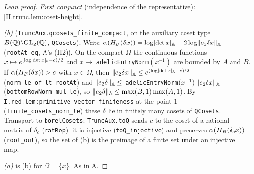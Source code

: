 \begin{proof}[Lean proof]
\emph{First conjunct} (independence of the representative): \cref{II.trunc.lem:coset-height}.

\emph{(b)} (\texttt{TruncAux.qcosets\_finite\_compact}, on the auxiliary coset type $B(\mathbb{Q})\backslash\mathrm{GL}_2(\mathbb{Q})$, \texttt{QCosets}). Write $\alpha(H_B(\delta x))=\log\lvert\det x\rvert_{\mathbb{A}}-2\log\lVert e_2\delta x\rVert_{\mathbb{A}}$ (\texttt{rootAt\_eq}, A's (H2)). On the compact $\Omega$ the continuous functions $x\mapsto e^{(\log\lvert\det x\rvert_{\mathbb{A}}-c)/2}$ and $x\mapsto$ \texttt{adelicEntryNorm}$(x^{-1})$ are bounded by $A$ and $B$. If $\alpha(H_B(\delta x))>c$ with $x\in\Omega$, then $\lVert e_2\delta x\rVert_{\mathbb{A}}\le e^{(\log\lvert\det x\rvert_{\mathbb{A}}-c)/2}$ (\texttt{norm\_le\_of\_lt\_rootAt}) and $\lVert e_2\delta\rVert_{\mathbb{A}}\le$ \texttt{adelicEntryNorm}$(x^{-1})\,\lVert e_2\delta x\rVert_{\mathbb{A}}$ (\texttt{bottomRowNorm\_mul\_le}), so $\lVert e_2\delta\rVert_{\mathbb{A}}\le\max(B,1)\max(A,1)$. By \texttt{I.red.lem:primitive-vector-finiteness} at the point $1$ (\texttt{finite\_cosets\_norm\_le}) these $\delta$ lie in finitely many cosets of \texttt{QCosets}. Transport to \texttt{borelCosets}: \texttt{TruncAux.toQ} sends $c$ to the coset of a rational matrix of $\delta_c$ (\texttt{ratRep}); it is injective (\texttt{toQ\_injective}) and preserves $\alpha(H_B(\delta_cx))$ (\texttt{root\_out}), so the set of (b) is the preimage of a finite set under an injective map.

\emph{(a)} is (b) for $\Omega=\{x\}$. As in A.
\end{proof}

